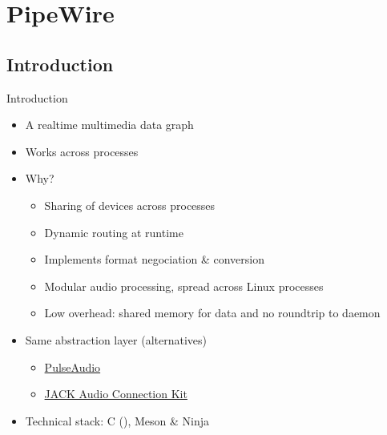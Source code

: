 \section{PipeWire}

\subsection{Introduction}

\begin{frame}{Introduction}
  \begin{itemize}
  \item A realtime multimedia data graph
  \item Works across processes
  \item Why?
    \begin{itemize}
    \item Sharing of devices across processes
    \item Dynamic routing at runtime
    \item Implements format negociation \& conversion
    \item Modular audio processing, spread across Linux processes
    \item Low overhead: shared memory for data and no roundtrip to daemon
    \end{itemize}
  \item Same abstraction layer (alternatives)
    \begin{itemize}
    \item \href{https://www.freedesktop.org/wiki/Software/PulseAudio/}{PulseAudio}
    \item \href{https://jackaudio.org/}{JACK Audio Connection Kit}
    \end{itemize}
  \item Technical stack: C (), Meson \& Ninja
  \end{itemize}
\end{frame}



